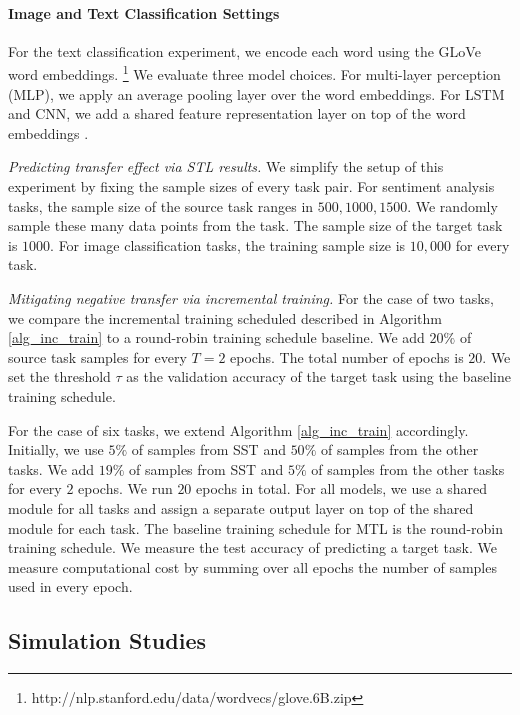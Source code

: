 \paragraph{Image and Text Classification Settings}\label{app_it}

For the text classification experiment, we encode each word using the GLoVe word embeddings.%
\footnote{http://nlp.stanford.edu/data/wordvecs/glove.6B.zip}
We evaluate three model choices.
For multi-layer perception (MLP), we apply an average pooling layer over the word embeddings.
For LSTM and CNN, we add a shared feature representation layer on top of the word embeddings \cite{lei2018simple}.

\textit{Predicting transfer effect via STL results.}
We simplify the setup of this experiment by fixing the sample sizes of every task pair.
For sentiment analysis tasks, the sample size of the source task ranges in $500, 1000, 1500$.
We randomly sample these many data points from the task.
The sample size of the target task is $1000$.
For image classification tasks, the training sample size is $10,000$ for every task.

\textit{Mitigating negative transfer via incremental training.}
For the case of two tasks, we compare the incremental training scheduled described in Algorithm \ref{alg_inc_train}  to a round-robin training schedule baseline.
We add $20\%$ of source task samples for every $T = 2$ epochs.
The total number of epochs is $20$.
We set the threshold $\tau$ as the validation accuracy of the target task using the baseline training schedule.

For the case of six tasks, we extend Algorithm \ref{alg_inc_train} accordingly.
Initially, we use $5\%$ of samples from SST and $50\%$ of samples from the other tasks.
We add $19\%$ of samples from SST and $5\%$ of samples from the other tasks for every $2$ epochs.
We run $20$ epochs in total.
For all models, we use a shared module for all tasks and assign a separate output layer on top of the shared module for each task.
The baseline training schedule for MTL is the round-robin training schedule.
We measure the test accuracy of predicting a target task.
We measure computational cost by summing over all epochs the number of samples used in every epoch.

\subsection{Simulation Studies}

